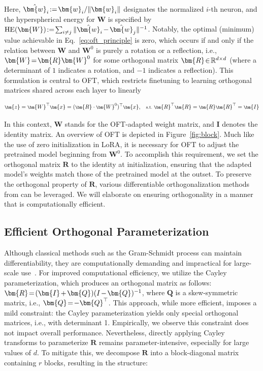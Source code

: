 Here, $\thickmuskip=2mu \medmuskip=2mu \hat{\bm{w}}_i:=\bm{w}_i/\|\bm{w}_i\|$ designates the normalized $i$-th neuron, and the hyperspherical energy for $\bm{W}$ is specified by $\thickmuskip=2mu \medmuskip=2mu \text{HE}(\bm{W}):= \sum_{i\neq j} \|\hat{\bm{w}}_i-\hat{\bm{w}}_j\|^{-1}$. Notably, the optimal (minimum) value achievable in Eq.~\eqref{eq:oft_principle} is zero, which occurs if and only if the relation between $\bm{W}$ and $\bm{W}^0$ is purely a rotation or a reflection, i.e., $\thickmuskip=2mu \medmuskip=2mu \bm{W}=\bm{R}\bm{W}^0$ for some orthogonal matrix $\thickmuskip=2mu \medmuskip=2mu \bm{R}\in\mathbb{R}^{d\times d}$ (where a determinant of $1$ indicates a rotation, and $-1$ indicates a reflection). This formulation is central to OFT, which restricts finetuning to learning orthogonal matrices shared across each layer to linearly

\begin{equation}\label{eq:oft_general}
    \footnotesize
    \bm{z} = \bm{W}^\top\bm{x} = (\bm{R} \cdot \bm{W}^0)^\top\bm{x},~~~\text{s.t.}~\bm{R}^\top\bm{R} = \bm{R}\bm{R}^\top = \bm{I}
\end{equation}

In this context, $\bm{W}$ stands for the OFT-adapted weight matrix, and $\bm{I}$ denotes the identity matrix. An overview of OFT is depicted in Figure~\ref{fig:block}. Much like the use of zero initialization in LoRA, it is necessary for OFT to adjust the pretrained model beginning from $\bm{W}^0$. To accomplish this requirement, we set the orthogonal matrix $\bm{R}$ to the identity at initialization, ensuring that the adapted model's weights match those of the pretrained model at the outset. To preserve the orthogonal property of $\bm{R}$, various differentiable orthogonalization methods from \cite{liu2021orthogonal,lezcano2019cheap} can be leveraged. We will elaborate on ensuring orthogonality in a manner that is computationally efficient.

\subsection{Efficient Orthogonal Parameterization}\label{sect:eff_ortho}

Although classical methods such as the Gram-Schmidt process can maintain differentiability, they are computationally demanding and impractical for large-scale use~\cite{liu2021orthogonal}. For improved computational efficiency, we utilize the Cayley parameterization, which produces an orthogonal matrix as follows: $\thickmuskip=2mu \medmuskip=2mu \bm{R} = (\bm{I} + \bm{Q})(I - \bm{Q})^{-1}$, where $\bm{Q}$ is a skew-symmetric matrix, i.e., $\thickmuskip=2mu \medmuskip=2mu \bm{Q} = -\bm{Q}^\top$. This approach, while more efficient, imposes a mild constraint: the Cayley parameterization yields only special orthogonal matrices, i.e., with determinant 1. Empirically, we observe this constraint does not impact overall performance. Nevertheless, directly applying Cayley transforms to parameterize $\bm{R}$ remains parameter-intensive, especially for large values of $d$. To mitigate this, we decompose $\bm{R}$ into a block-diagonal matrix containing $r$ blocks, resulting in the structure:

